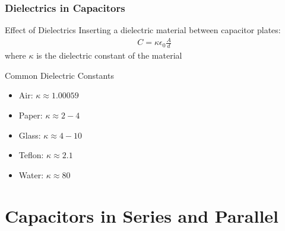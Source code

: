 \documentclass{beamer}
\begin{document}
\begin{frame}
    \frametitle{Dielectrics in Capacitors}
    
    \begin{block}{Effect of Dielectrics}
        Inserting a dielectric material between capacitor plates:
        \begin{align}
            C = \kappa\epsilon_0 \frac{A}{d}
        \end{align}
        where $\kappa$ is the dielectric constant of the material
    \end{block}
    
    \begin{block}{Common Dielectric Constants}
        \begin{itemize}
            \item Air: $\kappa \approx 1.00059$
            \item Paper: $\kappa \approx 2-4$
            \item Glass: $\kappa \approx 4-10$
            \item Teflon: $\kappa \approx 2.1$
            \item Water: $\kappa \approx 80$
        \end{itemize}
    \end{block}
    
 
\end{frame}

\section{Capacitors in Series and Parallel}
\end{document}
